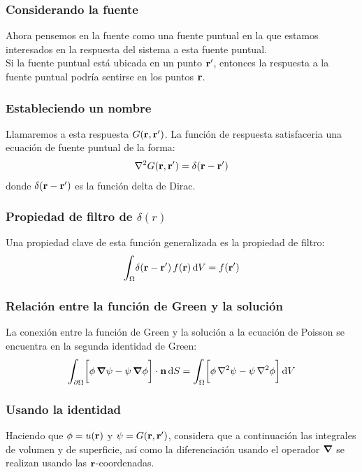 \documentclass[12pt]{beamer}
\begin{document}
\begin{frame}
\frametitle{Considerando la fuente}
Ahora pensemos en la fuente como una fuente puntual en la que estamos interesados en la respuesta del sistema a esta fuente puntual.
\\
\bigskip
\pause
Si la fuente puntual está ubicada en un punto $\vb{\ensuremath{{r}^{\prime}}}$, entonces la respuesta a la fuente puntual podría sentirse en los puntos $\vb{r}$.
\end{frame}
\begin{frame}
\frametitle{Estableciendo un nombre}
Llamaremos a esta respuesta $G(\vb{r}, \vb{\ensuremath{{r}^{\prime}}})$. \pause La función de respuesta satisfaceria una ecuación de fuente puntual de la forma:
\pause
\begin{align*}
\laplacian G(\vb{r}, \vb{\pderivada{r}}) = \delta (\vb{r} - \vb{\pderivada{r}})
\end{align*}
donde $\delta (\vb{r} - \vb{\ensuremath{{r}^{\prime}}})$ es la función delta de Dirac.
\end{frame}
\begin{frame}
\frametitle{Propiedad de filtro de $\delta (r)$}
Una propiedad clave de esta función generalizada es la propiedad de filtro:
\pause
\begin{align*}
\scaleint{6ex}_{\bs \Omega} \delta (\vb{r} - \vb{\pderivada{r}}) \, f (\vb{r}) \dd{V} = f (\vb{\pderivada{r}})
\end{align*}
\end{frame}
\begin{frame}
\frametitle{Relación entre la función de Green y la solución}
La conexión entre la función de Green y la solución a la ecuación de Poisson se encuentra en la segunda identidad de Green:
\pause
\begin{align*}
\scaleint{6ex}_{\bs \partial \Omega} \bigg[ \phi \, \grad{\psi} - \psi \, \grad{\phi} \bigg] \cdot \vb{n} \dd{S} = \scaleint{6ex}_{\bs \Omega} \bigg[ \phi \, \laplacian{\psi} - \psi \, \laplacian{\phi} \bigg] \dd{V}
\end{align*}
\end{frame}
\begin{frame}
\frametitle{Usando la identidad}
Haciendo que $\phi = u (\vb{r})$ y $\psi = G (\vb{r}, \vb{\ensuremath{{r}^{\prime}}})$, \pause considera que a continuación las integrales de volumen y de superficie, así como la diferenciación usando el operador $\grad$ se realizan usando las $\vb{r}$-coordenadas.
\end{frame}
\end{document}
